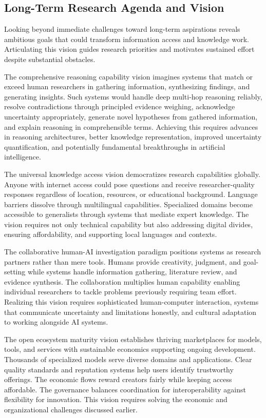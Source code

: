 \subsection{Long-Term Research Agenda and Vision}

Looking beyond immediate challenges toward long-term aspirations reveals ambitious goals that could transform information access and knowledge work. Articulating this vision guides research priorities and motivates sustained effort despite substantial obstacles.

The comprehensive reasoning capability vision imagines systems that match or exceed human researchers in gathering information, synthesizing findings, and generating insights. Such systems would handle deep multi-hop reasoning reliably, resolve contradictions through principled evidence weighing, acknowledge uncertainty appropriately, generate novel hypotheses from gathered information, and explain reasoning in comprehensible terms. Achieving this requires advances in reasoning architectures, better knowledge representation, improved uncertainty quantification, and potentially fundamental breakthroughs in artificial intelligence.

The universal knowledge access vision democratizes research capabilities globally. Anyone with internet access could pose questions and receive researcher-quality responses regardless of location, resources, or educational background. Language barriers dissolve through multilingual capabilities. Specialized domains become accessible to generalists through systems that mediate expert knowledge. The vision requires not only technical capability but also addressing digital divides, ensuring affordability, and supporting local languages and contexts.

The collaborative human-AI investigation paradigm positions systems as research partners rather than mere tools. Humans provide creativity, judgment, and goal-setting while systems handle information gathering, literature review, and evidence synthesis. The collaboration multiplies human capability enabling individual researchers to tackle problems previously requiring team effort. Realizing this vision requires sophisticated human-computer interaction, systems that communicate uncertainty and limitations honestly, and cultural adaptation to working alongside AI systems.

The open ecosystem maturity vision establishes thriving marketplaces for models, tools, and services with sustainable economics supporting ongoing development. Thousands of specialized models serve diverse domains and applications. Clear quality standards and reputation systems help users identify trustworthy offerings. The economic flows reward creators fairly while keeping access affordable. The governance balances coordination for interoperability against flexibility for innovation. This vision requires solving the economic and organizational challenges discussed earlier.


